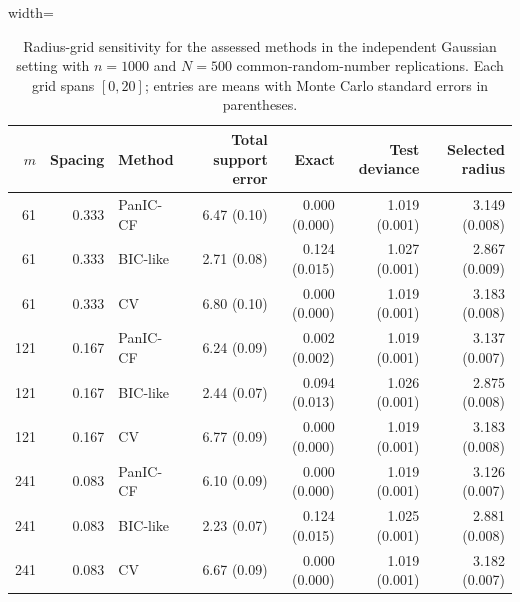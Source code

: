 \begin{table}[H]
\centering
\caption{Radius-grid sensitivity for the assessed methods in the independent Gaussian setting with $n=1000$ and $N=500$ common-random-number replications. Each grid spans $[0,20]$; entries are means with Monte Carlo standard errors in parentheses.}
\label{Table: grid sensitivity}
\begin{adjustbox}{width=\textwidth}
\scriptsize
\begin{tabular}{rrlrrrr}
\hline
$m$ & Spacing & Method & Total support error & Exact & Test deviance & Selected radius \\
\hline
61 & 0.333 & PanIC-CF & 6.47 (0.10) & 0.000 (0.000) & 1.019 (0.001) & 3.149 (0.008) \\
61 & 0.333 & BIC-like & 2.71 (0.08) & 0.124 (0.015) & 1.027 (0.001) & 2.867 (0.009) \\
61 & 0.333 & CV & 6.80 (0.10) & 0.000 (0.000) & 1.019 (0.001) & 3.183 (0.008) \\
121 & 0.167 & PanIC-CF & 6.24 (0.09) & 0.002 (0.002) & 1.019 (0.001) & 3.137 (0.007) \\
121 & 0.167 & BIC-like & 2.44 (0.07) & 0.094 (0.013) & 1.026 (0.001) & 2.875 (0.008) \\
121 & 0.167 & CV & 6.77 (0.09) & 0.000 (0.000) & 1.019 (0.001) & 3.183 (0.008) \\
241 & 0.083 & PanIC-CF & 6.10 (0.09) & 0.000 (0.000) & 1.019 (0.001) & 3.126 (0.007) \\
241 & 0.083 & BIC-like & 2.23 (0.07) & 0.124 (0.015) & 1.025 (0.001) & 2.881 (0.008) \\
241 & 0.083 & CV & 6.67 (0.09) & 0.000 (0.000) & 1.019 (0.001) & 3.182 (0.007) \\
\hline
\end{tabular}
\end{adjustbox}
\end{table}
